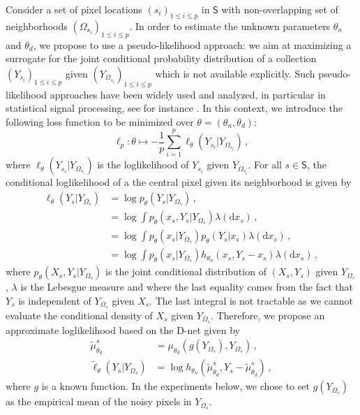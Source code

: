 \documentclass[lettersize,journal]{IEEEtran}
\begin{document}
Consider a set of pixel locations $(s_i)_{1\leqslant i\leqslant p}$ in $\mathsf{S}$ with non-overlapping set of neighborhoods $(\Omega_{s_i})_{1\leqslant i\leqslant p}$. In order to estimate the unknown parameters $\theta_n$ and $\theta_d$, we propose to use  a pseudo-likelihood approach: we aim at maximizing a surrogate for the joint conditional probability distribution of a collection $(Y_{s_i})_{1\leqslant i \leqslant p}$ given $(Y_{\Omega_{s_i}})_{1\leqslant i \leqslant p}$ which is not available explicitly. Such  pseudo-likelihood approaches have been widely used and analyzed, in particular in statistical signal processing, see for instance \cite{winkler2003image, koller2009probabilistic, amini2013pseudo}. In this context, we introduce the following loss function to be minimized over $\theta = (\theta_n,\theta_d)$:
$$
\ell_p: \theta \mapsto -\frac{1}{p}\sum_{i=1}^{p}\ell_{\theta}(Y_{s_i}|Y_{\Omega_{s_i}})\,,
$$
where $\ell_{\theta}(Y_{s_i}|Y_{\Omega_{s_i}})$ is the loglikelihood of $Y_{s_i}$ given $Y_{\Omega_{s_i}}$. For all $s\in \mathsf{S}$, the conditional loglikelihood of a the central pixel given its neighborhood is given by
\begin{align*}
\ell_{\theta}(Y_{s}|Y_{\Omega_{s}}) &= \log p_{\theta}(Y_s|Y_{\Omega_s})\,,\\
 &= \log\int p_{\theta}(x_s,Y_s|Y_{\Omega_s}) \lambda(\mathrm{d}x_s)\,,\\
&= \log\int p_{\theta}(x_s|Y_{\Omega_s})p_{\theta}(Y_s|x_s) \lambda(\mathrm{d}x_s)\,,\\
&= \log\int p_{\theta}(x_s|Y_{\Omega_s})h_{\theta_n}(x_s,Y_s-x_s) \lambda(\mathrm{d}x_s)\,,
\end{align*}
where $p_{\theta}(X_s,Y_s|Y_{\Omega_s})$ is the joint conditional distribution of $(X_s,Y_s)$ given $Y_{\Omega_s}$, $\lambda$ is the Lebesgue measure and where  the last equality comes from the fact that $Y_s$ is independent of $Y_{\Omega_s}$ given $X_s$. The last integral is not tractable as we cannot evaluate the conditional density of $X_s$ given $Y_{\Omega_s}$. Therefore, we propose an approximate loglikelihood based on the D-net given by
\begin{align*}
\tilde \mu^s_{\theta_d} &= \mu_{\theta_d}(g(Y_{\Omega_s}),Y_{\Omega_s})\,,\\
\widetilde \ell_{\theta}(Y_{s}|Y_{\Omega_{s}}) &= \log h_{\theta_n}(\tilde \mu^s_{\theta_d},Y_s-\tilde \mu^s_{\theta_d}) \,,
\end{align*}
where $g$ is a known function. In the experiments below, we chose to set $g(Y_{\Omega_s})$ as the empirical mean of the noisy pixels in $Y_{\Omega_s}$.
\end{document}
